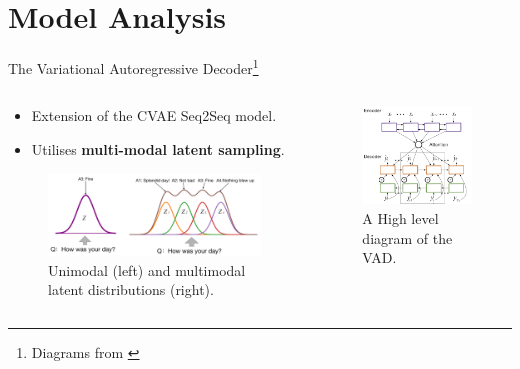 \documentclass[aspectratio=169, 11pt]{beamer}
\begin{document}
\section{Model Analysis}
\begin{frame}{The Variational Autoregressive Decoder\footnote{\tiny Diagrams from \cite{du_variational_2018}}}
  \begin{columns}
    \begin{column}{0.5\textwidth}
      \begin{itemize}
        \item Extension of the CVAE Seq2Seq model.
        \item Utilises \textbf{multi-modal latent sampling}.
      \end{itemize}
      \begin{figure}[!ht]
        \centering
        \includegraphics[width=60mm]{diagrams/vad_latent.png}
        \caption{Unimodal (left) and multimodal latent distributions (right).}
        \end{figure}
    \end{column}
    \begin{column}{0.5\textwidth}
  \begin{figure}[!ht]
    \centering
    \includegraphics[width=50mm]{diagrams/vad_high.png}
    \caption{A High level diagram of the VAD.}
    \end{figure}
  \end{column}
\end{columns}
\end{frame}
\end{document}
